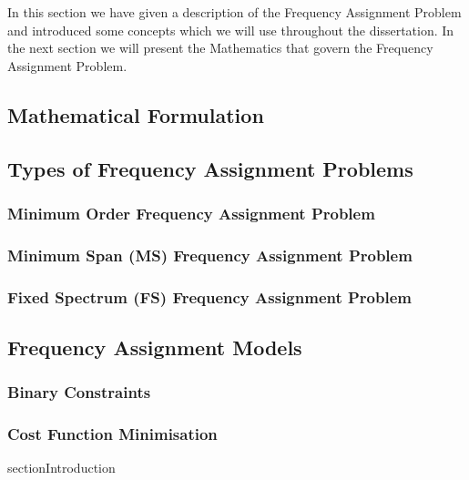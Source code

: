 In this section we have given a description of the Frequency Assignment Problem and introduced some concepts which we will use throughout the dissertation. In the next section we will present the 
Mathematics that govern the Frequency Assignment Problem.
\subsection{Mathematical Formulation}
\subsection{Types of Frequency Assignment Problems}
\subsubsection{Minimum Order Frequency Assignment Problem}
\subsubsection{Minimum Span (MS) Frequency Assignment Problem}
\subsubsection{Fixed Spectrum (FS) Frequency Assignment Problem}
\subsection{Frequency Assignment Models}
\subsubsection{Binary Constraints}
\subsubsection{Cost Function Minimisation}
section{Introduction}
